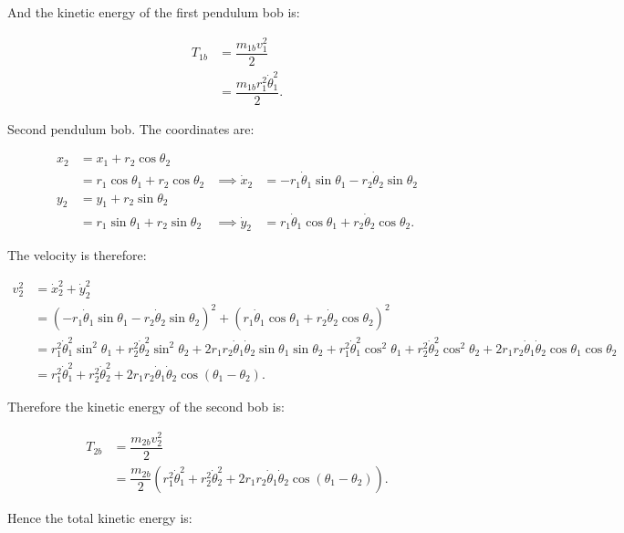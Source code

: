 \documentclass[12pt,a4paper,landscape]{article}
\begin{document}
	And the kinetic energy of the first pendulum bob is:
	
	\begin{align*}
		T_{1b} &= \dfrac{m_{1b} v_1^2}{2} \\
		&= \dfrac{m_{1b} r_1^2 \dot{\theta}_1^2}{2}.
	\end{align*}
	
	Second pendulum bob. The coordinates are:
	
	\begin{align*}
		x_2 &= x_1 + r_2 \cos{\theta_2} \\
		&= r_1 \cos{\theta_1} + r_2 \cos{\theta_2} &\implies \dot{x}_2 &= -r_1\dot{\theta}_1 \sin{\theta_1}-r_2\dot{\theta}_2 \sin{\theta_2}\\
		y_2 &= y_1 + r_2 \sin{\theta_2} \\
		&= r_1 \sin{\theta_1} + r_2 \sin{\theta_2} &\implies \dot{y}_2 &= r_1\dot{\theta}_1 \cos{\theta_1}+r_2\dot{\theta}_2 \cos{\theta_2}.
	\end{align*}
	
	The velocity is therefore:
	
	\begin{align*}
		v_2^2 &= \dot{x}_2^2 + \dot{y}_2^2 \\
		&= \left(-r_1\dot{\theta}_1 \sin{\theta_1}-r_2\dot{\theta}_2 \sin{\theta_2}\right)^2 + \left(r_1\dot{\theta}_1 \cos{\theta_1}+r_2\dot{\theta}_2 \cos{\theta_2}\right)^2 \\
		&= r_1^2 \dot{\theta}_1^2 \sin^2{\theta_1} + r_2^2 \dot{\theta}_2^2 \sin^2{\theta_2} + 2r_1 r_2 \dot{\theta}_1\dot{\theta}_2 \sin{\theta_1}\sin{\theta_2} + r_1^2 \dot{\theta}_1^2 \cos^2{\theta_1} + r_2^2 \dot{\theta}_2^2 \cos^2{\theta_2} + 2r_1 r_2 \dot{\theta}_1 \dot{\theta}_2 \cos{\theta_1}\cos{\theta_2} \\
		&= r_1^2 \dot{\theta}_1^2 + r_2^2 \dot{\theta}_2^2 + 2r_1 r_2 \dot{\theta}_1 \dot{\theta}_2 \cos{\left(\theta_1-\theta_2\right)}.
	\end{align*}
	
	Therefore the kinetic energy of the second bob is:
	
	\begin{align*}
		T_{2b} &= \dfrac{m_{2b} v_2^2}{2} \\
		&= \dfrac{m_{2b}}{2} \left(r_1^2 \dot{\theta}_1^2 + r_2^2 \dot{\theta}_2^2 + 2r_1 r_2 \dot{\theta}_1 \dot{\theta}_2 \cos{\left(\theta_1-\theta_2\right)}\right).
	\end{align*}
	
	Hence the total kinetic energy is:
	
\end{document}
